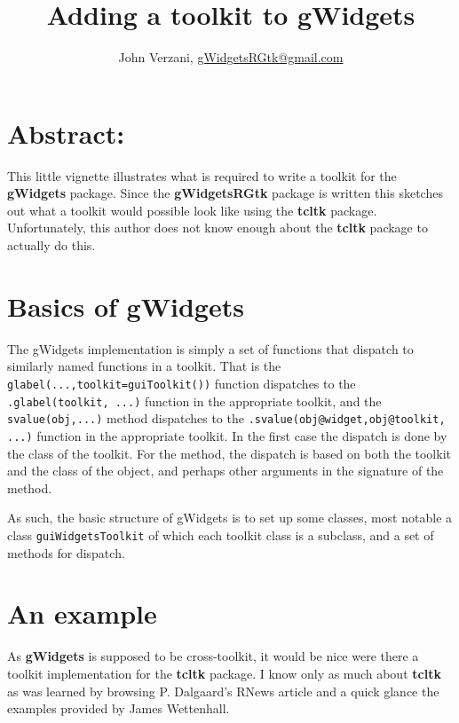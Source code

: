 \documentclass[12pt]{article}
\newcommand{\RCode}[1]{\texttt{#1}}
\newcommand{\RPackage}[1]{\textbf{#1}}
\begin{document}
\thispagestyle{plain}
\title{Adding a toolkit to gWidgets}

\author{John Verzani, \url{gWidgetsRGtk@gmail.com}}
\maketitle

\section*{Abstract:}
This little vignette illustrates what is required to write a toolkit
for the \RPackage{gWidgets} package. Since the \RPackage{gWidgetsRGtk}
package is written this sketches out what a toolkit would possible
look like using the \RPackage{tcltk} package. Unfortunately, this
author does not know enough about the \RPackage{tcltk} package to
actually do this.

\setcounter{tocdepth}{3}
\tableofcontents

\section{Basics of gWidgets}

The gWidgets implementation is simply a set of functions that dispatch
to similarly named functions in a toolkit. That is the \RCode{glabel(...,toolkit=guiToolkit())}
function dispatches to the \RCode{.glabel(toolkit, ...)} function in the appropriate
toolkit, and the \RCode{svalue(obj,...)} method dispatches to the
\RCode{.svalue(obj@widget,obj@toolkit, ...)} function in the appropriate
toolkit. In the first case the dispatch is done by the class of the
toolkit. For the method, the dispatch is based on both the toolkit and
the class of the object, and perhaps other arguments in the signature
of the method.

As such, the basic structure of gWidgets is to set up some classes,
most notable a class \RCode{guiWidgetsToolkit} of which each toolkit
class is a subclass, and a set of methods for dispatch.


\section{An example}
As \RPackage{gWidgets} is supposed to be cross-toolkit, it would be
nice were there a toolkit implementation for the \RPackage{tcltk}
package. I know only as much about \RPackage{tcltk} as was learned
by browsing P. Dalgaard's RNews article and a quick glance the examples
provided by James Wettenhall.
\end{document}
